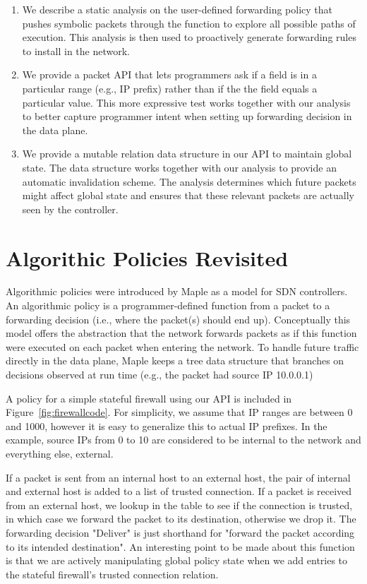 \documentclass[preprint]{sigplanconf}
\begin{document}
\begin{enumerate}
\item We describe a static analysis on the user-defined forwarding policy that pushes symbolic packets through the function to explore all possible paths of execution. This analysis is then used to proactively generate forwarding rules to install in the network.
\item We provide a packet API that lets programmers ask if a field is in a particular range (e.g., IP prefix) rather than if the the field equals a particular value. This more expressive test works together with our analysis to better capture programmer intent when setting up forwarding decision in the data plane.
\item We provide a mutable relation data structure in our API to maintain global state. The data structure works together with our analysis to provide an automatic invalidation scheme. The analysis determines which future packets might affect global state and ensures that these relevant packets are actually seen by the controller.
\end{enumerate}



\section*{Algorithic Policies Revisited}
Algorithmic policies were introduced by Maple as a model for SDN controllers. An algorithmic policy is a programmer-defined function from a packet to a forwarding decision (i.e., where the packet(s) should end up). Conceptually this model offers the abstraction that the network forwards packets as if this function were executed on each packet when entering the network. To handle future traffic directly in the data plane, Maple keeps a tree data structure that branches on decisions observed at run time (e.g., the packet had source IP 10.0.0.1)


A policy for a simple stateful firewall using our API is included in Figure~\ref{fig:firewallcode}. For simplicity, we assume that IP ranges are between 0 and 1000, however it is easy to generalize this to actual IP prefixes.
In the example, source IPs from 0 to 10 are considered to be internal to the network and everything else, external. 

If a packet is sent from an internal host to an external host, the pair of internal and external host is added to a list of trusted connection. If a packet is received from an external host, we lookup in the table to see if the connection is trusted, in which case we forward the packet to its destination, otherwise we drop it. The forwarding decision "Deliver" is just shorthand for "forward the packet according to its intended destination".
An interesting point to be made about this function is that we are actively manipulating global policy state when we add entries to the stateful firewall's trusted connection relation.
\end{document}
